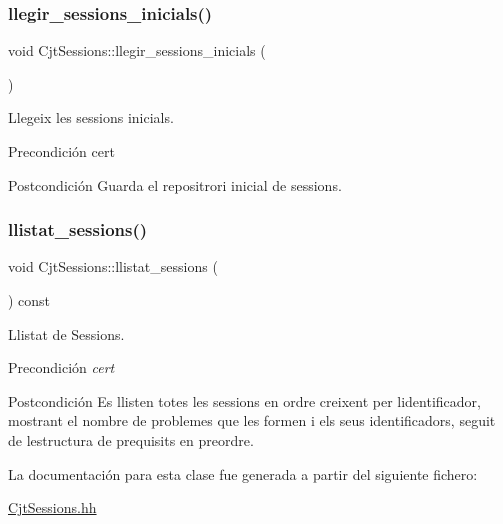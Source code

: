 \subsubsection{\texorpdfstring{llegir\+\_\+sessions\+\_\+inicials()}{llegir\_sessions\_inicials()}}
{\footnotesize\ttfamily void Cjt\+Sessions\+::llegir\+\_\+sessions\+\_\+inicials (\begin{DoxyParamCaption}{ }\end{DoxyParamCaption})}



Llegeix les sessions inicials. 

\begin{DoxyPrecond}{Precondición}
cert 
\end{DoxyPrecond}
\begin{DoxyPostcond}{Postcondición}
Guarda el repositrori inicial de sessions. 
\end{DoxyPostcond}
\mbox{\label{class_cjt_sessions_a1e4f04be3e5da3d8f9091620d56ea355}} 
\subsubsection{\texorpdfstring{llistat\+\_\+sessions()}{llistat\_sessions()}}
{\footnotesize\ttfamily void Cjt\+Sessions\+::llistat\+\_\+sessions (\begin{DoxyParamCaption}{ }\end{DoxyParamCaption}) const}



Llistat de Sessions. 

\begin{DoxyPrecond}{Precondición}
{\itshape cert} 
\end{DoxyPrecond}
\begin{DoxyPostcond}{Postcondición}
Es llisten totes les sessions en ordre creixent per l\textquotesingle{}identificador, mostrant el nombre de problemes que les formen i els seus identificadors, seguit de l\textquotesingle{}estructura de prequisits en preordre. 
\end{DoxyPostcond}


La documentación para esta clase fue generada a partir del siguiente fichero\+:\begin{DoxyCompactItemize}
\item 
\mbox{\hyperlink{_cjt_sessions_8hh}{Cjt\+Sessions.\+hh}}\end{DoxyCompactItemize}
